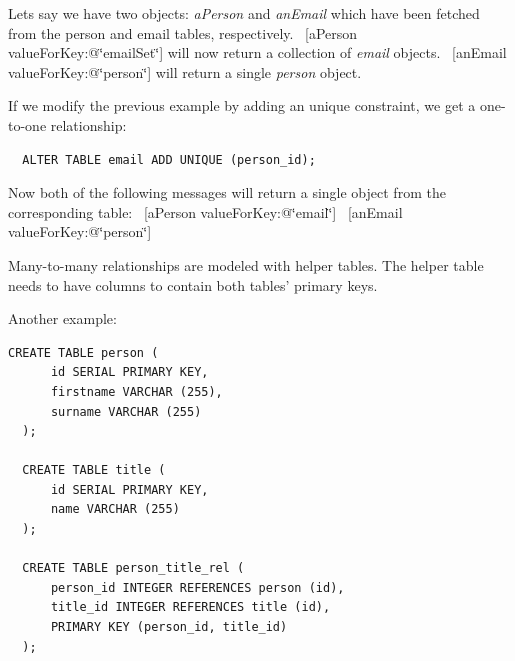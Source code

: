 Lets say we have two objects\+: {\itshape a\+Person} and {\itshape an\+Email} which have been fetched from the person and email tables, respectively.~\newline
 {\ttfamily \mbox{[}a\+Person value\+For\+Key\+:@\char`\"{}email\+Set\char`\"{}\mbox{]}} will now return a collection of {\itshape email} objects.~\newline
 {\ttfamily \mbox{[}an\+Email value\+For\+Key\+:@\char`\"{}person\char`\"{}\mbox{]}} will return a single {\itshape person} object.

If we modify the previous example by adding an unique constraint, we get a one-\/to-\/one relationship\+:

 
  \begin{lstlisting}
  ALTER TABLE email ADD UNIQUE (person_id);
  \end{lstlisting} 
   

Now both of the following messages will return a single object from the corresponding table\+:~\newline
 {\ttfamily \mbox{[}a\+Person value\+For\+Key\+:@\char`\"{}email\char`\"{}\mbox{]}}~\newline
 {\ttfamily \mbox{[}an\+Email value\+For\+Key\+:@\char`\"{}person\char`\"{}\mbox{]}}

Many-\/to-\/many relationships are modeled with helper tables. The helper table needs to have columns to contain both tables' primary keys.

Another example\+:  
  \begin{lstlisting}[caption=Tables with a many-to-many relationship]
  CREATE TABLE person (
      id SERIAL PRIMARY KEY,
      firstname VARCHAR (255),
      surname VARCHAR (255)
  );
 
  CREATE TABLE title (
      id SERIAL PRIMARY KEY,
      name VARCHAR (255)
  );
 
  CREATE TABLE person_title_rel (
      person_id INTEGER REFERENCES person (id),
      title_id INTEGER REFERENCES title (id),
      PRIMARY KEY (person_id, title_id)
  );
  \end{lstlisting} 
   

